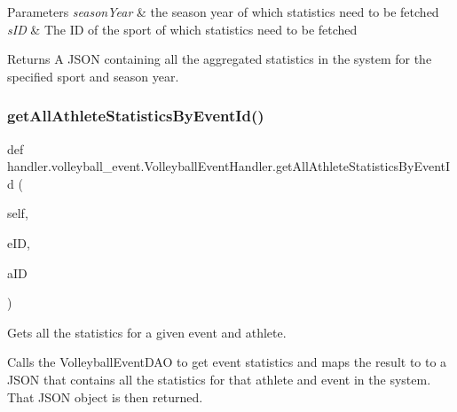 \begin{DoxyParams}{Parameters}
{\em season\+Year} & the season year of which statistics need to be fetched \\
\hline
{\em s\+ID} & The ID of the sport of which statistics need to be fetched\\
\hline
\end{DoxyParams}
\begin{DoxyReturn}{Returns}
A J\+S\+ON containing all the aggregated statistics in the system for the specified sport and season year. 
\end{DoxyReturn}
\mbox{\label{classhandler_1_1volleyball__event_1_1_volleyball_event_handler_aa7490b8d47d54bc0f190fa23e9b2d1b0}} 
\subsubsection{\texorpdfstring{get\+All\+Athlete\+Statistics\+By\+Event\+Id()}{getAllAthleteStatisticsByEventId()}}
{\footnotesize\ttfamily def handler.\+volleyball\+\_\+event.\+Volleyball\+Event\+Handler.\+get\+All\+Athlete\+Statistics\+By\+Event\+Id (\begin{DoxyParamCaption}\item[{}]{self,  }\item[{}]{e\+ID,  }\item[{}]{a\+ID }\end{DoxyParamCaption})}



Gets all the statistics for a given event and athlete. 

Calls the Volleyball\+Event\+D\+AO to get event statistics and maps the result to to a J\+S\+ON that contains all the statistics for that athlete and event in the system. That J\+S\+ON object is then returned.



